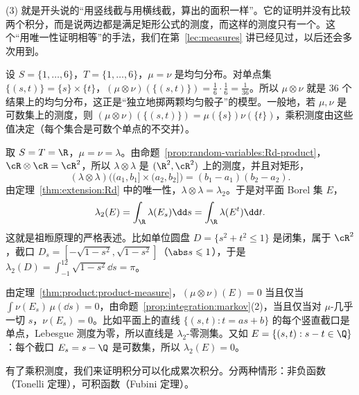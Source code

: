 \begin{remark}
(3) 就是开头说的“用竖线截与用横线截，算出的面积一样”。它的证明并没有比较两个积分，而是说两边都是满足矩形公式的测度，而这样的测度只有一个。这个“用唯一性证明相等”的手法，我们在第~\ref{lec:measures} 讲已经见过，以后还会多次用到。
\end{remark}

\begin{example}[有限集合上的乘积测度]\label{ex:product:finite}
设 $S=\{1,\dots,6\}$，$T=\{1,\dots,6\}$，$\mu=\nu$ 是均匀分布。对单点集 $\{(s,t)\}=\{s\}\times\{t\}$，$(\mu\otimes\nu)(\{(s,t)\})=\frac16\cdot\frac16=\frac1{36}$。所以 $\mu\otimes\nu$ 就是 $36$ 个结果上的均匀分布，这正是“独立地掷两颗均匀骰子”的模型。一般地，若 $\mu,\nu$ 是可数集上的测度，则 $(\mu\otimes\nu)(\{(s,t)\})=\mu(\{s\})\nu(\{t\})$，乘积测度由这些值决定（每个集合是可数个单点的不交并）。
\end{example}

\begin{example}\label{ex:product:lebesgue}
取 $S=T=\R$，$\mu=\nu=\lambda$。由命题~\ref{prop:random-variables:Rd-product}，$\cR\otimes\cR=\cR^2$，所以 $\lambda\otimes\lambda$ 是 $(\R^2,\cR^2)$ 上的测度，并且对矩形，
\[
(\lambda\otimes\lambda)\bigl((a_1,b_1]\times(a_2,b_2]\bigr)=(b_1-a_1)(b_2-a_2).
\]
由定理~\ref{thm:extension:Rd} 中的唯一性，$\lambda\otimes\lambda=\lambda_2$。于是对平面 Borel 集 $E$，
\[
\lambda_2(E)=\int_\R\lambda(E_s)\dd s=\int_\R\lambda(E^t)\dd t .
\]
这就是祖暅原理的严格表述。比如单位圆盘 $D=\{s^2+t^2\leqslant1\}$ 是闭集，属于 $\cR^2$，截口 $D_s=[-\sqrt{1-s^2},\sqrt{1-s^2}]$（$\abs s\leqslant1$），于是 $\lambda_2(D)=\int_{-1}^12\sqrt{1-s^2}\dd s=\pi$。
\end{example}

\begin{example}[零测集的刻画]\label{ex:product:null}
由定理~\ref{thm:product:product-measure}，$(\mu\otimes\nu)(E)=0$ 当且仅当 $\int\nu(E_s)\,\mu(\dd s)=0$，由命题~\ref{prop:integration:markov}(2)，当且仅当对 $\mu$-几乎一切 $s$，$\nu(E_s)=0$。比如平面上的直线 $\{(s,t):t=as+b\}$ 的每个竖直截口是单点，Lebesgue 测度为零，所以直线是 $\lambda_2$-零测集。又如 $E=\{(s,t):s-t\in\Q\}$：每个截口 $E_s=s-\Q$ 是可数集，所以 $\lambda_2(E)=0$。
\end{example}


有了乘积测度，我们来证明积分可以化成累次积分。分两种情形：非负函数（Tonelli 定理），可积函数（Fubini 定理）。


